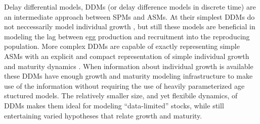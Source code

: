 %
Delay differential models, DDMs (or delay difference models in discrete time) 
are an intermediate approach between SPMs and ASMs. At their simplest DDMs do 
not neccessarily model individual growth \cite{dick_depletion-based_2011, aalto_separating_2015}, 
but still these models are beneficial in modeling the lag between egg production 
and recruitment into the reproducing population.  %
More complex DDMs are capable of exactly representing simple ASMs with an 
explicit and compact representation of simple individual growth and maturity 
dynamics \cite{deriso_harvesting_1980, fournier_length-based_1987, schnute_general_1985, schnute_general_1987}.
When information about individual growth is available these DDMs have enough 
growth and maturity modeling infrastructure to make use of the information 
without requiring the use of heavily parameterized age stuctured models. %
The relatively smaller size, and yet flexibile dynamics, of DDMs makes them ideal for 
modeling ``data-limited'' stocks, while still entertaining varied hypotheses that 
relate growth and maturity.  



